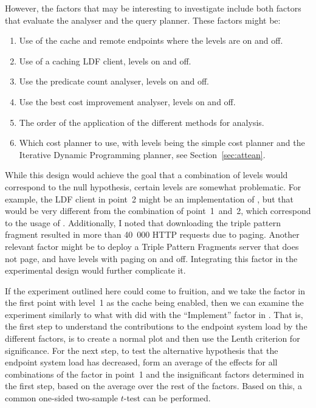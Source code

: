 However, the factors that may be interesting to investigate include
both factors that evaluate the analyser and the query planner. These
factors might be:

\begin{enumerate}
\item Use of the cache and remote endpoints where the levels are on
  and off.
\item Use of a caching LDF client, levels on and
  off.
\item Use the predicate count analyser, levels on and off.
\item Use the best cost improvement analyser, levels on and off.
\item The order of the application of the different methods for
  analysis.
\item Which cost planner to use, with levels being the simple cost
  planner and the Iterative Dynamic Programming planner, see
  Section~\ref{sec:attean}.
\end{enumerate}

While this design would achieve the goal that a combination of levels
would correspond to the null hypothesis, certain levels are somewhat
problematic. For example, the LDF client in point~2
might be an implementation of \cite{verborgh2014querying}, but that
would be very different from the combination of point~1~and~2, which
correspond to the usage of
. Additionally, I noted
that downloading the triple pattern fragment
resulted in more than 40~000 HTTP requests due to
paging. Another relevant factor might be to deploy a Triple Pattern
Fragments server that does not page, and have levels with paging on
and off. Integrating this factor in the experimental design would
further complicate it.

If the experiment outlined here could come to fruition, and we take
the factor in the first point with level~1 as the cache being enabled,
then we can examine the experiment similarly to what with did with the
``Implement'' factor in \cite{kjernsmo_doe_intro}. That is, the first
step to understand the contributions to the endpoint system load by
the different factors, is to create a normal plot and then use the
Lenth criterion for significance. For the next step, to test the
alternative hypothesis that the endpoint system load has decreased,
form an average of the effects for all combinations of the factor in
point~1 and the insignificant factors determined in the first step,
based on the average over the rest of the factors. Based on this, a
common one-sided two-sample $t$-test can be performed.


